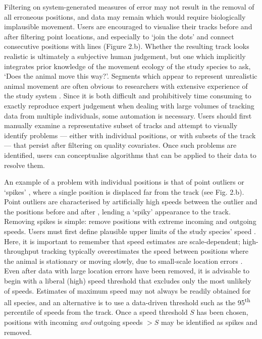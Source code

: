 \documentclass[10pt,paper=a4,headings=standardclasses
]{scrartcl}
\begin{document}
Filtering on system-generated measures of error may not result in the removal of all erroneous positions, and data may remain which would require biologically implausible movement.
Users are encouraged to visualise their tracks before and after filtering point locations, and especially to `join the dots' and connect consecutive positions with lines (Figure 2.b).
Whether the resulting track looks realistic is ultimately a subjective human judgement, but one which implicitly integrates prior knowledge of the movement ecology of the study species to ask, `Does the animal move this way?'.
Segments which appear to represent unrealistic animal movement are often obvious to researchers with extensive experience of the study system \citep[the non-movement approach; see][]{bjorneraas2010}.
Since it is both difficult and prohibitively time consuming to exactly reproduce expert judgement when dealing with large volumes of tracking data from multiple individuals, some automation is necessary.
Users should first manually examine a representative subset of tracks and attempt to visually identify problems --- either with individual positions, or with subsets of the track --- that persist after filtering on quality covariates.
Once such problems are identified, users can conceptualise algorithms that can be applied to their data to resolve them.

An example of a problem with individual positions is that of point outliers or `spikes' \citep{bjorneraas2010}, where a single position is displaced far from the track (see Fig. 2.b).
Point outliers are characterised by artificially high speeds between the outlier and the positions before and after \citep[called incoming and outgoing speed, respectively;][]{bjorneraas2010}, lending a `spiky' appearance to the track.
Removing spikes is simple: remove positions with extreme incoming and outgoing speeds.
Users must first define plausible upper limits of the study species' speed \citep{calenge2009, seidel2018}.
Here, it is important to remember that speed estimates are scale-dependent; high-throughput tracking typically overestimates the speed between positions where the animal is stationary or moving slowly, due to small-scale location errors \citep{ranacher2016, noonan2019}. 
Even after data with large location errors have been removed, it is advisable to begin with a liberal (high) speed threshold that excludes only the most unlikely of speeds.
Estimates of maximum speed may not always be readily obtained for all species, and an alternative is to use a data-driven threshold such as the 95\textsuperscript{th} percentile of speeds from the track.
Once a speed threshold $S$ has been chosen, positions with incoming \textit{and} outgoing speeds $> S$ may be identified as spikes and removed.
\end{document}
